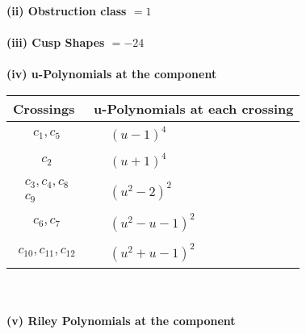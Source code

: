 \documentclass[1p]{elsarticle_modified}
\theoremstyle{definition}
\begin{document}
\flushleft \textbf{(ii) Obstruction class $= 1$}\\~\\
\flushleft \textbf{(iii) Cusp Shapes $= -24$}\\~\\
\newpage\renewcommand{\arraystretch}{1}
\flushleft \textbf{(iv) u-Polynomials at the component}\newline \\
\begin{tabular}{m{50pt}|m{274pt}}
Crossings & \hspace{64pt}u-Polynomials at each crossing \\
\hline $$\begin{aligned}c_{1},c_{5}\end{aligned}$$&$\begin{aligned}
&(u-1)^4
\end{aligned}$\\
\hline $$\begin{aligned}c_{2}\end{aligned}$$&$\begin{aligned}
&(u+1)^4
\end{aligned}$\\
\hline $$\begin{aligned}c_{3},c_{4},c_{8}\\c_{9}\end{aligned}$$&$\begin{aligned}
&(u^2-2)^2
\end{aligned}$\\
\hline $$\begin{aligned}c_{6},c_{7}\end{aligned}$$&$\begin{aligned}
&(u^2- u-1)^2
\end{aligned}$\\
\hline $$\begin{aligned}c_{10},c_{11},c_{12}\end{aligned}$$&$\begin{aligned}
&(u^2+u-1)^2
\end{aligned}$\\
\hline
\end{tabular}\\~\\
\newpage\renewcommand{\arraystretch}{1}
\flushleft \textbf{(v) Riley Polynomials at the component}\newline \\
\end{document}
